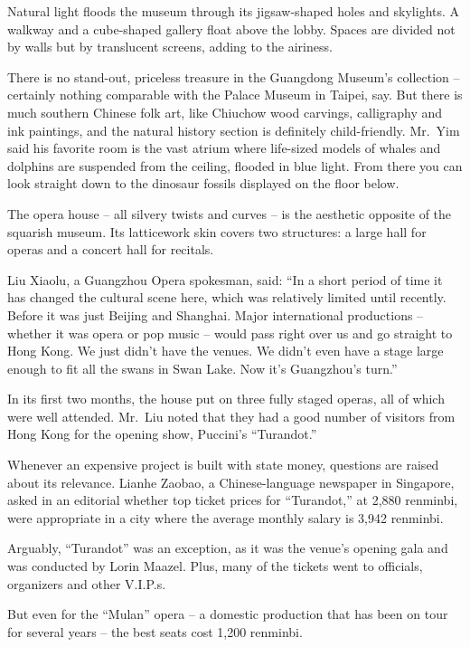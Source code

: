 ﻿\documentclass[12pt]{article}
\begin{document}
Natural light floods the museum through its jigsaw-shaped holes and skylights. A walkway and a
cube-shaped gallery float above the lobby. Spaces are divided not by walls but by translucent
screens, adding to the airiness.

There is no stand-out, priceless treasure in the Guangdong Museum's collection -- certainly nothing
comparable with the Palace Museum in Taipei, say. But there is much southern Chinese folk art, like
Chiuchow wood carvings, calligraphy and ink paintings, and the natural history section is definitely
child-friendly. Mr.~Yim said his favorite room is the vast atrium where life-sized models of whales
and dolphins are suspended from the ceiling, flooded in blue light. From there you can look straight
down to the dinosaur fossils displayed on the floor below.

The opera house -- all silvery twists and curves -- is the aesthetic opposite of the squarish
museum. Its latticework skin covers two structures: a large hall for operas and a concert hall for
recitals.

Liu Xiaolu, a Guangzhou Opera spokesman, said: ``In a short period of time it has changed the
cultural scene here, which was relatively limited until recently. Before it was just Beijing and
Shanghai. Major international productions -- whether it was opera or pop music -- would pass right
over us and go straight to Hong Kong. We just didn't have the venues. We didn't even have a stage
large enough to fit all the swans in Swan Lake. Now it's Guangzhou's turn.''

In its first two months, the house put on three fully staged operas, all of which were well
attended. Mr.~Liu noted that they had a good number of visitors from Hong Kong for the opening show,
Puccini's ``Turandot.''

Whenever an expensive project is built with state money, questions are raised about its relevance.
Lianhe Zaobao, a Chinese-language newspaper in Singapore, asked in an editorial whether top ticket
prices for ``Turandot,'' at 2,880 renminbi, were appropriate in a city where the average monthly
salary is 3,942 renminbi.

Arguably, ``Turandot'' was an exception, as it was the venue's opening gala and was conducted by
Lorin Maazel. Plus, many of the tickets went to officials, organizers and other V.I.P.s.

But even for the ``Mulan'' opera -- a domestic production that has been on tour for several years --
the best seats cost 1,200 renminbi.
\end{document}
